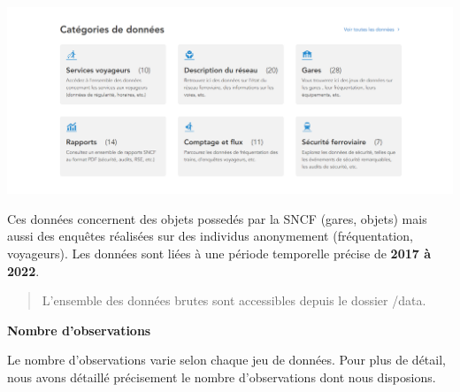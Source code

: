 \documentclass[
]{article}
\begin{document}
\includegraphics{images/categories-donnees.png}

Ces données concernent des objets possedés par la SNCF (gares, objets)
mais aussi des enquêtes réalisées sur des individus anonymement
(fréquentation, voyageurs). Les données sont liées à une période
temporelle précise de \textbf{2017 à 2022}.

\begin{quote}
L'ensemble des données brutes sont accessibles depuis le dossier /data.
\end{quote}

\textbf{Nombre d'observations}

Le nombre d'observations varie selon chaque jeu de données. Pour plus de
détail, nous avons détaillé précisement le nombre d'observations dont
nous disposions.
\end{document}
